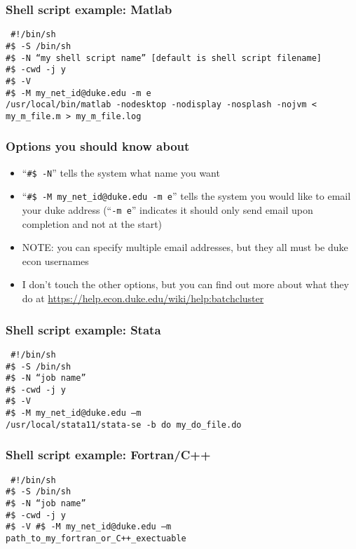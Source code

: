 \documentclass[english,xcolor=dvipsnames]{beamer}
\newcommand{\bi}{\begin{itemize}}
\newcommand{\ei}{\end{itemize}}
\begin{document}
\begin{frame}
\frametitle{Shell script example: Matlab}
\texttt{
\hspace{-.25cm}\#!/bin/sh\\
\#\$ -S /bin/sh\\
\#\$ -N ``my shell script name'' [default is shell script filename]\\
\#\$ -cwd -j y\\
\#\$ -V\\
\#\$ -M my\_net\_id@duke.edu -m e\\
/usr/local/bin/matlab -nodesktop -nodisplay -nosplash -nojvm < my\_m\_file.m > my\_m\_file.log
}

\end{frame}

\begin{frame}
\frametitle{Options you should know about}

   \bi 
   \item ``\texttt{\#\$ -N}'' tells the system what name you want
   \item ``\texttt{\#\$ -M my\_net\_id@duke.edu -m e}'' tells the system you would like to email your duke address (``\texttt{-m e}'' indicates it should only send email upon completion and not at the start)
   \item NOTE: you can specify multiple email addresses, but they all must be duke econ usernames
   \item I don't touch the other options, but you can find out more about what they do at \url{https://help.econ.duke.edu/wiki/help:batchcluster}
   \ei
\end{frame}

\begin{frame}
\frametitle{Shell script example: Stata}
\texttt{
\hspace{-.25cm}\#!/bin/sh\\
\#\$ -S /bin/sh\\
\#\$ -N ``job name''\\
\#\$ -cwd -j y\\
\#\$ -V\\
\#\$ -M my\_net\_id@duke.edu --m \\
/usr/local/stata11/stata-se -b do my\_do\_file.do
}
\end{frame}

\begin{frame}
\frametitle{Shell script example: Fortran/C++}
\texttt{
\hspace{-.25cm}\#!/bin/sh\\
\#\$ -S /bin/sh\\
\#\$ -N ``job name''\\
\#\$ -cwd -j y\\
\#\$ -V\
\#\$ -M my\_net\_id@duke.edu --m \\
path\_to\_my\_fortran\_or\_C++\_exectuable
}
\end{frame}
\end{document}
